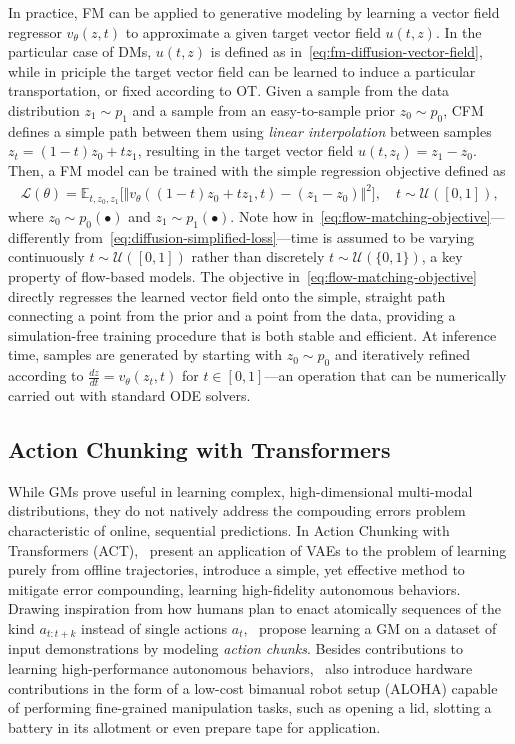 In practice, FM can be applied to generative modeling by learning a vector field regressor \( v_\theta(z, t) \) to approximate a given target vector field \( u(t, z) \).
In the particular case of DMs, \( u(t, z) \) is defined as in~\ref{eq:fm-diffusion-vector-field}, while in priciple the target vector field can be learned to induce a particular transportation, or fixed according to OT.
Given a sample from the data distribution \( z_1 \sim p_1 \) and a sample from an easy-to-sample prior \( z_0 \sim p_0 \), CFM defines a simple path between them using \emph{linear interpolation} between samples \( z_t = (1-t)z_0 + t z_1 \), resulting in the target vector field \( u(t, z_t) = z_1 - z_0 \).
Then, a FM model can be trained with the simple regression objective defined as
\begin{align}\label{eq:flow-matching-objective}
    \mathcal L(\theta) = \mathbb{E}_{t, z_0, z_1} \big[
        \Vert v_\theta((1-t)z_0 + t z_1, t) - (z_1 - z_0) \Vert^2 \big], \quad t \sim \mathcal{U}([0,1]),
\end{align}
where \( z_0 \sim p_0(\bullet) \) and \( z_1 \sim p_1(\bullet) \). Note how in~\ref{eq:flow-matching-objective}---differently from~\ref{eq:diffusion-simplified-loss}---time is assumed to be varying continuously \( t \sim \mathcal U([0,1]) \) rather than discretely \( t \sim \mathcal U(\{0,1\}) \), a key property of flow-based models.
The objective in~\ref{eq:flow-matching-objective} directly regresses the learned vector field onto the simple, straight path connecting a point from the prior and a point from the data, providing a simulation-free training procedure that is both stable and efficient.
At inference time, samples are generated by starting with \( z_0 \sim p_0 \) and iteratively refined according to \( \frac{dz}{dt} = v_\theta(z_t, t) \) for \(t \in [0,1] \)---an operation that can be numerically carried out with standard ODE solvers.

\subsection{Action Chunking with Transformers}
While GMs prove useful in learning complex, high-dimensional multi-modal distributions, they do not natively address the compouding errors problem characteristic of online, sequential predictions.
In Action Chunking with Transformers (ACT),~\citet{zhaoLearningFineGrainedBimanual2023} present an application of VAEs to the problem of learning purely from offline trajectories, introduce a simple, yet effective method to mitigate error compounding, learning high-fidelity autonomous behaviors.
Drawing inspiration from how humans plan to enact atomically sequences of the kind \( a_{t:t+k} \) instead of single actions \( a_t \),~\citet{zhaoLearningFineGrainedBimanual2023} propose learning a GM on a dataset of input demonstrations by modeling \emph{action chunks}.
Besides contributions to learning high-performance autonomous behaviors,~\citet{zhaoLearningFineGrainedBimanual2023} also introduce hardware contributions in the form of a low-cost bimanual robot setup (ALOHA) capable of performing fine-grained manipulation tasks, such as opening a lid, slotting a battery in its allotment or even prepare tape for application.

